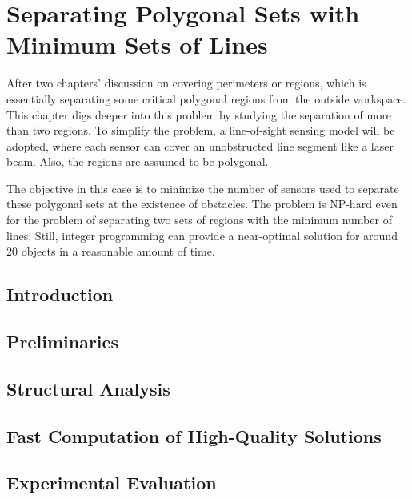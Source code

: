 \chapter{Separating Polygonal Sets with Minimum Sets of Lines}
\thispagestyle{myheadings}

After two chapters' discussion on covering perimeters or regions, which is essentially separating 
some critical polygonal regions from the outside workspace. 
This chapter digs deeper into this problem by studying the separation of more than two regions. 
To simplify the problem, a line-of-sight sensing model will be adopted, where each sensor can cover
an unobstructed line segment like a laser beam. Also, the regions are assumed to be polygonal.

The objective in this case is to minimize the number of sensors used to separate these polygonal sets 
at the existence of obstacles.
The problem is NP-hard even for the problem of separating two sets of regions with the minimum number of lines. 
Still, integer programming can provide a near-optimal solution for around 20 objects in a reasonable amount of time. 

\section{Introduction}
\label{sec:bf-intro}

\section{Preliminaries}\label{sec:bf-preliminary}


\section{Structural Analysis}\label{sec:bf-structure}


\section{Fast Computation of High-Quality Solutions}\label{sec:bf-algorithm}


\section{Experimental Evaluation}\label{sec:bf-evaluation}

